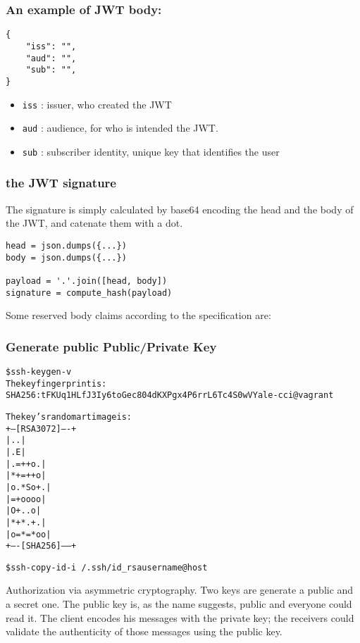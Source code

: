 \subsubsection{An example of JWT body:}
\begin{lstlisting}
{
    "iss": "",
    "aud": "",
    "sub": "",
}
\end{lstlisting}
\begin{itemize}
    \item \texttt{iss} : issuer, who created the JWT
    \item \texttt{aud} : audience, for who is intended the JWT.
    \item \texttt{sub} : subscriber identity, unique key that identifies the
        user
\end{itemize}

\subsubsection{the JWT signature}
The signature is simply calculated by base64 encoding the head and the body of
the JWT, and catenate them with a dot.
\begin{lstlisting}
head = json.dumps({...})
body = json.dumps({...})

payload = '.'.join([head, body])
signature = compute_hash(payload)
\end{lstlisting}

Some reserved body claims according to the specification are:

\subsubsection{Generate public Public/Private Key}
\begin{alltt}
    \$ ssh-keygen -v
    The key fingerprint is:
    SHA256:tFKUq1HLfJ3Iy6toGec804dKXPgx4P6rrL6Tc4S0wVY ale-cci@vagrant

    The key's randomart image is:
    +---[RSA 3072]----+
    |        ..       |
    |       .E        |
    |     . =++ o .   |
    |      *+=++ o    |
    |     o.*So+.     |
    |      =+oooo     |
    |       O+..o     |
    |      *+*.+ .    |
    |     o=*=*oo     |
    +----[SHA256]-----+


    \$ ssh-copy-id -i ~/.ssh/id_rsa username@host
\end{alltt}
Authorization via asymmetric cryptography. Two keys are generate a public and a secret one.
The public key is, as the name suggests, public and everyone could read it.
The client encodes his messages with the private key; the receivers could validate the authenticity of those messages using the public key.

